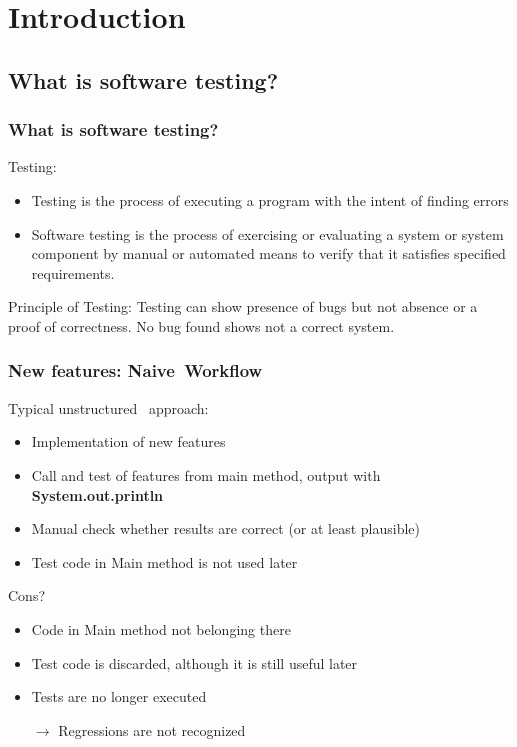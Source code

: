 
\section{Introduction}
\subsection{What is software testing?}


\begin{frame}[fragile]
\frametitle{What is software testing?}

\begin{block}{Testing:}
\begin{itemize}
\item Testing is the process of executing a program with the intent of finding errors 
\item Software testing is the process of exercising or evaluating a system or system component by manual or automated means to verify that it satisfies specified requirements. 
\end{itemize}
\end{block}

\pause

\begin{block}{Principle of Testing:}
Testing can show presence of bugs but not absence or a proof of correctness. No bug found shows not a correct system.
\end{block}

\end{frame}


\begin{frame}
\frametitle{New features: \glqq Naive\grqq\ Workflow}
 
Typical  \glqq unstructured \grqq\ approach:
\begin{itemize}
   \item Implementation of new features
   \item Call and test of features from main method, output with \textbf{System.out.println}
   \item Manual check whether results are correct (or at least plausible)
   \item Test code in Main method is not used later
\end{itemize}
 
 \pause
 
Cons?
 \begin{itemize}
	 \item Code in Main method not  \glqq belonging there\grqq
		\item Test code is discarded, although it is still useful later
		\item Tests are no longer executed
   \item[$\rightarrow$] Regressions are not recognized
\end{itemize}
\end{frame}

